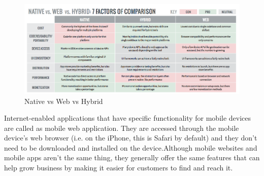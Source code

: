 \begin{figure}[!htb]	
  \includegraphics[max width=\linewidth,scale = 3]{figures/MobAppTypes.png}
	 \caption{Native vs Web vs Hybrid}
  \label{fig: Native vs Web vs Hybrid}
\end{figure}	
			
			 Internet-enabled applications that have specific functionality for mobile devices are called as mobile web application. They are accessed through the mobile device’s web browser (i.e. on the iPhone, this is Safari by default) and they don’t need to be downloaded and installed on the device.Although mobile websites and mobile apps aren't the same thing, they generally offer the same features that can help grow business by making it easier for customers to find and reach it. 
			

